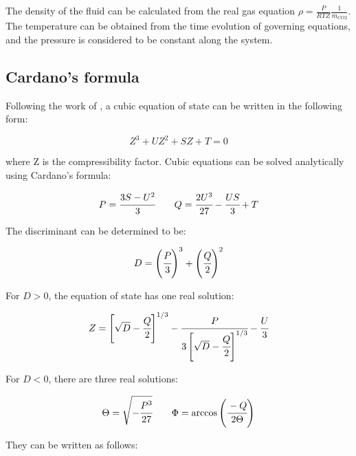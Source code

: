\documentclass[a4paper,fleqn]{cas-dc}
\begin{document}
					The density of the fluid can be calculated from the real gas equation $\rho = \frac{P}{RTZ} \frac{1}{m_{CO2}}$. The temperature can be obtained from the time evolution of governing equations, and the pressure is considered to be constant along the system. 
					
					
					\subsection{Cardano's formula} \label{CH: Cardano}
					
					Following the work of \citet{Gmehling2019}, a cubic equation of state can be written in the following form:
					
					{\footnotesize
						\begin{equation}
							Z^3 + UZ^2+ SZ + T = 0
						\end{equation}
					}
					
					where Z is the compressibility factor. Cubic equations can be solved analytically using Cardano's formula:
					
					{\footnotesize
						\begin{equation*}
							P = \cfrac{3S-U^2}{3} \qquad Q = \cfrac{2U^3}{27}-\cfrac{US}{3} + T
						\end{equation*}
					}
					
					The discriminant can be determined to be:
					
					{\footnotesize
						\begin{equation}
							D = \left( \cfrac{P}{3} \right)^3 + \left( \cfrac{Q}{2} \right)^2
						\end{equation}
					}
					
					For $D>0$, the equation of state has one real solution:
					
					{\footnotesize
						\begin{equation}
							Z = \left[ \sqrt{D} - \cfrac{Q}{2} \right]^{1/3} - \cfrac{P}{ 3 \left[ \sqrt{D}-\cfrac{Q}{2} \right]^{1/3} } - \cfrac{U}{3}
						\end{equation}
					}
					
					For $D<0$, there are three real solutions:
					
					{\footnotesize
						\begin{equation*}
							\Theta = \sqrt{-\cfrac{P^3}{27}} \qquad \Phi = \arccos\left( \cfrac{-Q}{2\Theta} \right)
						\end{equation*}
					}
					
					They can be written as follows:
					
\end{document}
